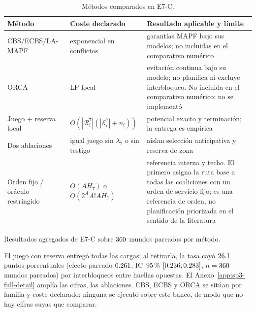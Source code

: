 \begin{table}[!htbp]
  \centering
  \caption{Métodos comparados en E7-C.}
  \label{tab:sp3-compact-e7-methods}
  \fontsize{7.6}{8.6}\selectfont
  \setlength{\tabcolsep}{2.2pt}
  \renewcommand{\arraystretch}{1.08}
  \begin{tabularx}{\textwidth}{>{\raggedright\arraybackslash}p{3.0cm} >{\raggedright\arraybackslash}p{2.2cm} Y}
    \toprule
    Método & Coste declarado & Resultado aplicable y límite \\
    \midrule
    CBS/ECBS/LA-MAPF \parencite{sharon2015cbs,barer2014ecbs,li2019largeAgentMapf} & exponencial en conflictos & garantías MAPF bajo sus modelos; no incluidas en el comparativo numérico \\
    ORCA \parencite{vandenberg2011orca} & LP local & evitación continua bajo su modelo; no planifica ni excluye interbloqueo. No incluida en el comparativo numérico: no se implementó \\
    Juego + reserva local & $O(|\mathcal R_i^7|(|\mathcal E_i^7|+n_i))$ & potencial exacto y terminación; la entrega es empírica \\
    Dos ablaciones & igual juego sin $\lambda_7$ o sin testigo & aíslan selección anticipativa y reserva de zona \\
    Orden fijo / oráculo restringido & $O(AH_7)$ o $O(2^AA!AH_7)$ & referencia interna y techo. El primero asigna la ruta base a todas las coaliciones con un orden de servicio fijo; es una referencia de orden, no planificación priorizada en el sentido de la literatura \\
    \bottomrule
  \end{tabularx}
\end{table}

\begin{table}[!htbp]
  \centering
  \caption[Resultados agregados de E7-C sobre 360 mundos pareados por método.]{Resultados agregados de E7-C sobre $\SPSevenWorlds$ mundos pareados por método.}
  \label{tab:sp3-compact-e7-results}
  \scriptsize
  \resizebox{\textwidth}{!}{}
  \viuownsource
\end{table}

El juego con reserva entregó todas las cargas; al retirarla, la tasa cayó
$26.1$ puntos porcentuales (efecto pareado
$0.261$, IC~95\,\% $[0.236; 0.283]$, $n=360$ mundos
pareados) por interbloqueos entre huellas opuestas. El Anexo~\ref{app:sp3-full-detail} amplía las cifras, las
ablaciones. CBS, ECBS y ORCA se sitúan por familia y coste declarado; ninguna
se ejecutó sobre este banco, de modo que no hay cifras suyas que comparar.

